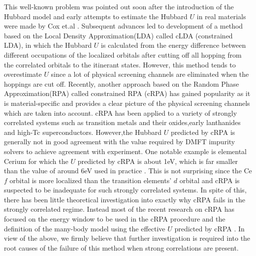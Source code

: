 \documentclass[10pt]{ruthesis}
\begin{document}
{This well-known problem was pointed out soon after the introduction of the Hubbard model and early attempts to estimate the Hubbard $U$ in real materials were made by Cox et.al \cite{IOP_HubbU_transition_metal_1973_B_N_Cox}. Subsequent advances led to development of a method based on the Local Density Approximation(LDA) called cLDA (constrained LDA),  in which the Hubbard $U$ is calculated from the energy difference between different occupations of the localized orbitals after cutting off all hopping from the correlated orbitals to the itinerant states\cite{PRB_cLDA_Cuprates_1988_McMahan,PRB_cLDA_cuprates_1989_Christensen,PRB_cLDA_Fe_Ce_1991_Anisirnov}.
However, this method tends to overestimate $U$ since a lot of physical screening channels are eliminated when the hoppings are cut off. 
Recently, another  approach based on the Random Phase Approximation(RPA) called constrained RPA (cRPA)\cite{PRB_CRPAMethodInvented_1998_F.Ary,PRB_lowenegymodel_for_firstprincilpes__2004_F.Ary} has  gained popularity as it is material-specific and provides a clear picture of the physical screening channels which are taken into account.  cRPA has been applied to a variety of strongly correlated systems such as transition metals and their oxides\cite{PRB_CalculationofHubU_cRPA._2006_F.Ary,PRB_cRPAonTransitionMetal_2008_F.ARy,PRB_cRPAonTransition_oxide_2012_S.Biermann,PRB_cRPAonTransition_oxide_2012_P.H.Zhang,PRB_cRPAonTrans_oxides_2013_F.Ary},early lanthanides\cite{PRB_cRPAonearlyLanthanide_2013_F.Ary,PRB_Screened_Coul_inter_cal_2014_F.Bruneval} and high-Tc superconductors\cite{JPSJ_lowenergyOFironbaseSC_2010_M.Imada,PRB_DyanmicScreening_LaCuO_2015_P.Werner_F.Ary}. However,the Hubbard $U$ predicted by cRPA is generally not in good agreement with the value required by DMFT impurity solvers to achieve agreement with experiment. One notable example \cite{PRB_Screened_Coul_inter_cal_2014_F.Bruneval} is elemental Cerium for which the $U$ predicted by cRPA is about 1eV, which is far smaller than the value of around 6eV used in practice . 
This is not surprising since the Ce $f$ orbital is more localized than the transition elements' $d$ orbital and cRPA is suspected to be inadequate for such strongly correlated systems. In spite of this, there has been little theoretical investigation into exactly why cRPA fails in the strongly correlated regime. Instead  most of the recent research on cRPA has focused on the energy window to be used in the cRPA procedure and the definition of the many-body model using the effective  $U$ predicted by cRPA \cite{PRB_cRPAonTrans_oxides_2013_F.Ary,JPSJ_lowenergyOFironbaseSC_2010_M.Imada}. In view of the above, we firmly believe that further investigation is required into the root causes of the failure of this method when strong correlations are present. 

}
\end{document}

